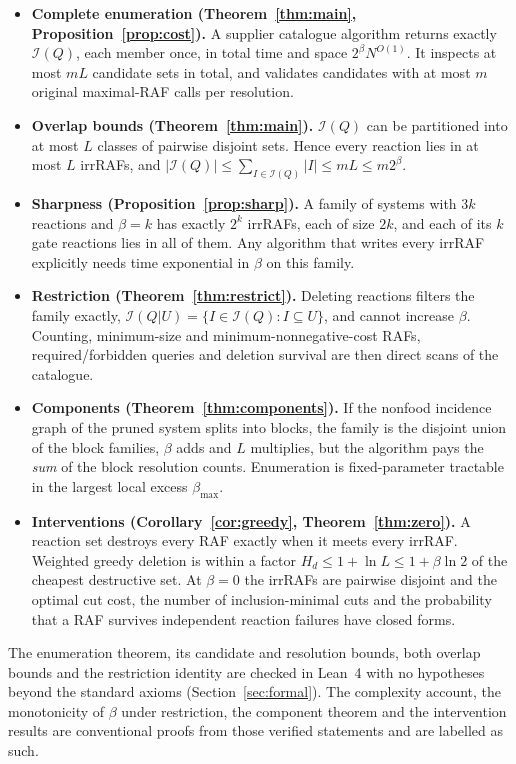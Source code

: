 \documentclass[11pt,a4paper]{article}
\theoremstyle{plain}
\theoremstyle{definition}
\theoremstyle{remark}
\newcommand{\Irr}{\mathcal I}
\newcommand{\bmax}{\beta_{\max}}
\begin{document}
\begin{itemize}
\item \textbf{Complete enumeration (Theorem~\ref{thm:main}, Proposition~\ref{prop:cost}).} A supplier catalogue algorithm returns exactly $\Irr(Q)$, each member once, in total time and space $2^\beta N^{O(1)}$. It inspects at most $mL$ candidate sets in total, and validates candidates with at most $m$ original maximal-RAF calls per resolution.
\item \textbf{Overlap bounds (Theorem~\ref{thm:main}).} $\Irr(Q)$ can be partitioned into at most $L$ classes of pairwise disjoint sets. Hence every reaction lies in at most $L$ irrRAFs, and $|\Irr(Q)|\le\sum_{I\in\Irr(Q)}|I|\le mL\le m2^\beta$.
\item \textbf{Sharpness (Proposition~\ref{prop:sharp}).} A family of systems with $3k$ reactions and $\beta=k$ has exactly $2^k$ irrRAFs, each of size $2k$, and each of its $k$ gate reactions lies in all of them. Any algorithm that writes every irrRAF explicitly needs time exponential in $\beta$ on this family.
\item \textbf{Restriction (Theorem~\ref{thm:restrict}).} Deleting reactions filters the family exactly, $\Irr(Q|U)=\{I\in\Irr(Q):I\subseteq U\}$, and cannot increase $\beta$. Counting, minimum-size and minimum-nonnegative-cost RAFs, required/forbidden queries and deletion survival are then direct scans of the catalogue.
\item \textbf{Components (Theorem~\ref{thm:components}).} If the nonfood incidence graph of the pruned system splits into blocks, the family is the disjoint union of the block families, $\beta$ adds and $L$ multiplies, but the algorithm pays the \emph{sum} of the block resolution counts. Enumeration is fixed-parameter tractable in the largest local excess $\bmax$.
\item \textbf{Interventions (Corollary~\ref{cor:greedy}, Theorem~\ref{thm:zero}).} A reaction set destroys every RAF exactly when it meets every irrRAF. Weighted greedy deletion is within a factor $H_d\le1+\ln L\le1+\beta\ln2$ of the cheapest destructive set. At $\beta=0$ the irrRAFs are pairwise disjoint and the optimal cut cost, the number of inclusion-minimal cuts and the probability that a RAF survives independent reaction failures have closed forms.
\end{itemize}

The enumeration theorem, its candidate and resolution bounds, both overlap bounds and the restriction identity are checked in Lean~4 \cite{demoura2021lean4,mathlib2020} with no hypotheses beyond the standard axioms (Section~\ref{sec:formal}). The complexity account, the monotonicity of $\beta$ under restriction, the component theorem and the intervention results are conventional proofs from those verified statements and are labelled as such.
\end{document}
